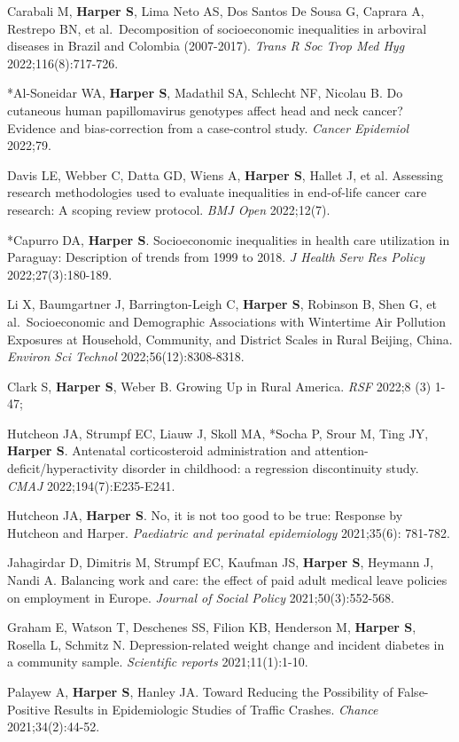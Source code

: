 \documentclass[
  letterpaper,
  DIV=11,
  numbers=noendperiod]{scrartcl}
\begin{document}
Carabali M, \textbf{Harper S}, Lima Neto AS, Dos Santos De Sousa G,
Caprara A, Restrepo BN, et al.~Decomposition of socioeconomic
inequalities in arboviral diseases in Brazil and Colombia (2007-2017).
\emph{Trans R Soc Trop Med Hyg} 2022;116(8):717-726.

*Al-Soneidar WA, \textbf{Harper S}, Madathil SA, Schlecht NF, Nicolau B.
Do cutaneous human papillomavirus genotypes affect head and neck cancer?
Evidence and bias-correction from a case-control study. \emph{Cancer
Epidemiol} 2022;79.

Davis LE, Webber C, Datta GD, Wiens A, \textbf{Harper S}, Hallet J, et
al. Assessing research methodologies used to evaluate inequalities in
end-of-life cancer care research: A scoping review protocol. \emph{BMJ
Open} 2022;12(7).

*Capurro DA, \textbf{Harper S}. Socioeconomic inequalities in health
care utilization in Paraguay: Description of trends from 1999 to 2018.
\emph{J Health Serv Res Policy} 2022;27(3):180-189.

Li X, Baumgartner J, Barrington-Leigh C, \textbf{Harper S}, Robinson B,
Shen G, et al.~Socioeconomic and Demographic Associations with
Wintertime Air Pollution Exposures at Household, Community, and District
Scales in Rural Beijing, China. \emph{Environ Sci Technol}
2022;56(12):8308-8318.

Clark S, \textbf{Harper S}, Weber B. Growing Up in Rural America.
\emph{RSF} 2022;8 (3) 1-47;

Hutcheon JA, Strumpf EC, Liauw J, Skoll MA, *Socha P, Srour M, Ting JY,
\textbf{Harper S}. Antenatal corticosteroid administration and
attention-deficit/hyperactivity disorder in childhood: a regression
discontinuity study. \emph{CMAJ} 2022;194(7):E235-E241.

Hutcheon JA, \textbf{Harper S}. No, it is not too good to be true:
Response by Hutcheon and Harper. \emph{Paediatric and perinatal
epidemiology} 2021;35(6): 781-782.

Jahagirdar D, Dimitris M, Strumpf EC, Kaufman JS, \textbf{Harper S},
Heymann J, Nandi A. Balancing work and care: the effect of paid adult
medical leave policies on employment in Europe. \emph{Journal of Social
Policy} 2021;50(3):552-568.

Graham E, Watson T, Deschenes SS, Filion KB, Henderson M, \textbf{Harper
S}, Rosella L, Schmitz N. Depression-related weight change and incident
diabetes in a community sample. \emph{Scientific reports}
2021;11(1):1-10.

Palayew A, \textbf{Harper S}, Hanley JA. Toward Reducing the Possibility
of False-Positive Results in Epidemiologic Studies of Traffic Crashes.
\emph{Chance} 2021;34(2):44-52.
\end{document}
